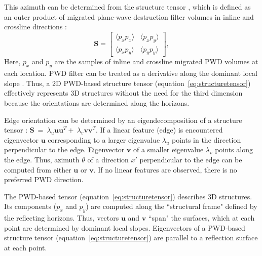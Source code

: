 This azimuth can be determined from the structure tensor
\cite[]{van1995estimators,weickert1997review,fehmers2003fast,hale2009structure,wu2017directional,wu2017directional2}, which is defined as
an outer product of migrated plane-wave destruction filter volumes in inline and crossline directions \cite[]{merzlikin2016diffraction,merzlikin2017diffraction}:
\begin{equation}
\label{eq:structuretensor}
\mathbf S=
\begin{bmatrix}
\langle p_x p_x \rangle & \langle p_x p_y \rangle \\ \langle p_x p_y \rangle & \langle p_y p_y \rangle
\end{bmatrix}
,
\end{equation}
Here, $p_x$ and $p_y$ are the samples of inline
and crossline
migrated PWD volumes 
at each location. PWD filter can be treated
as a derivative along the dominant local slope \cite[]{fomel02,fomel07}. Thus, a 2D PWD-based structure tensor (equation~\ref{eq:structuretensor}) effectively represents 3D structures without
the need for the third dimension because the orientations are determined along the horizons.

Edge orientation can be determined by an eigendecomposition of a structure tensor \cite[]{fehmers2003fast,hale2009structure}:
$\mathbf{S}\ =\ \lambda_{u} \mathbf{u}\mathbf{u}^T +\ \lambda_{v} \mathbf{v}\mathbf{v}^T$.
If a linear feature (edge) is encountered eigenvector $\mathbf{u}$ corresponding to a larger eigenvalue $\lambda_{u}$ points in the direction perpendicular to the edge. Eigenvector $\mathbf{v}$
of a smaller eigenvalue $\lambda_{v}$ points along the edge. Thus, azimuth $\theta$ of a direction $x'$ perpendicular to the edge can be computed from either $\mathbf{u}$ or $\mathbf{v}$.
If no linear features are observed, there is no preferred PWD direction.

The PWD-based tensor (equation~\ref{eq:structuretensor}) describes 3D structures. Its components ($p_x$ and $p_y$) are computed along the ``structural frame"
defined by the reflecting horizons. Thus, vectors $\mathbf{u}$ and $\mathbf{v}$ ``span" the surfaces, which at each point are determined by dominant local slopes.
Eigenvectors of a PWD-based structure tensor (equation~\ref{eq:structuretensor}) are parallel to a reflection surface at each point.  

